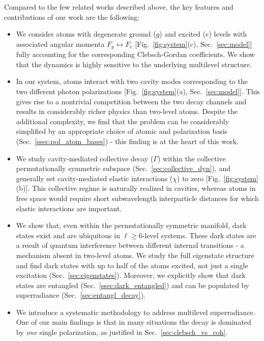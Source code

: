 \documentclass[aps,prx,superscriptaddress,twocolumn,notitlepage,nofootinbib,longbibliography]{revtex4-2}
\begin{document}
Compared to the few related works described above, the key features and contributions of our work are the following:
\begin{itemize}

\item  We consider atoms with degenerate ground ($g$) and excited ($e$) levels with associated  angular momenta $F_g\leftrightarrow F_e$ [Fig.~\ref{fig:system}(c), Sec.~\ref{sec:model}] fully accounting for the corresponding Clebsch-Gordan coefficients.
We show that the dynamics is highly sensitive to the underlying multilevel structure. 

\item In our system, atoms interact with two cavity modes corresponding to the two different photon polarizations [Fig.~\ref{fig:system}(a), Sec.~\ref{sec:model}]. This gives rise to a nontrivial competition between the two decay channels and results in considerably richer physics than two-level atoms.
Despite the additional complexity, we find that the problem can be considerably simplified by an appropriate choice of atomic and polarization basis (Sec.~\ref{ssec:pol_atom_bases}) - this finding is at the heart of this work.


\item We study cavity-mediated collective decay ($\Gamma$) within the collective permutationally symmetric subspace (Sec.~\ref{sec:collective_dyn}), and generally set cavity-mediated elastic interactions ($\chi$) to zero [Fig.~\ref{fig:system}(b)].
This collective regime is naturally realized in cavities, whereas atoms in free space would require short subwavelength interparticle distances for which elastic interactions are important.

\item We show that, even within the permutationally symmetric manifold, dark states exist and are ubiquitous in $\ell\geq6$-level systems.
These dark states are a result of quantum interference between different internal transitions - a mechanism absent in two-level atoms. 
We study the full eigenstate structure and find dark states with up to half of the atoms excited, not just a single excitation (Sec.~\ref{sec:eigenstates}). Moreover, we explicitly show that dark states are entangled (Sec.~\ref{ssec:dark_entangled}) and can be populated by superradiance (Sec.~\ref{sec:entangl_decay}).

\item We introduce a systematic methodology to address multilevel superradiance. One of our main findings is that in many situations
the decay is dominated by \emph{one} single polarization, as justified in  Sec.~\ref{sec:clebsch_vs_coh}.


\end{itemize}
\end{document}
